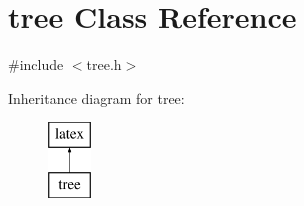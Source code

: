 \hypertarget{classtree}{\section{tree Class Reference}
\label{classtree}
}


{\ttfamily \#include $<$tree.\-h$>$}

Inheritance diagram for tree\-:\begin{figure}[H]
\begin{center}
\leavevmode
\includegraphics[height=2.000000cm]{classtree}
\end{center}
\end{figure}

